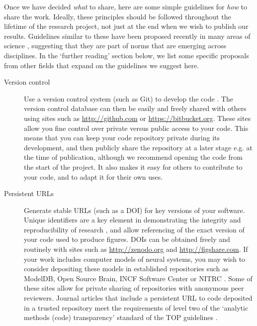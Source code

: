 \documentclass[11pt]{article}
\begin{document}
Once we have decided \textit{what} to share, here are some simple 
guidelines for \textit{how} to share the work.  Ideally, these
principles should be followed throughout the lifetime of the research project,
not just at the end when we wish to publish our results. Guidelines similar to these have been proposed recently in many areas of science \cite{Nosek2015, miguel2014, stodden2012journals}, suggesting that they are part of norms that are emerging across disciplines. In the `further reading' section below, we list some specific proposals from other fields that expand on the guidelines we suggest here.  

\begin{description}
\item [Version control] Use a version control system (such as Git) to
  develop the code \cite{Blischak2016}.  The version control database
  can then be easily and freely shared with others using sites such as
  \url{http://github.com} \cite{Ram2013} or
  \url{https://bitbucket.org}.  These sites allow you fine control
  over private versus public access to your code.  This means that you
  can keep your code repository private during its development, and
  then publicly share the repository at a later stage e.g. at the time
  of publication, although we recommend opening the code from the
  start of the project.  It also makes it easy for others to
  contribute to your code, and to adapt it for their own uses.

\item [Persistent URLs] Generate stable URLs (such as a DOI) for key
  versions of your software.  Unique identifiers are a key element in
  demonstrating the integrity and reproducibility of research
  \cite{vasilevsky2013reproducibility}, and allow referencing of the 
  exact version of your code used to produce figures. DOIs can be
  obtained freely and routinely with sites such as
  \url{http://zenodo.org} and \url{http://figshare.com}.  If your work
  includes computer models of neural systems, you may wish to consider
  depositing these models in established repositories such as
  ModelDB\cite{modeldb}, Open Source Brain\cite{osb}, INCF
  Software Center\cite{web:incf-software} or NITRC
  \cite{poline_software_2014}. Some of these sites allow for private
  sharing of repositories with anonymous peer reviewers. Journal
  articles that include a persistent URL to code deposited in a
  trusted repository meet the requirements of level two of the
  `analytic methods (code) transparency' standard of the TOP
  guidelines \cite{Nosek2015}.



\end{description}
\end{document}

